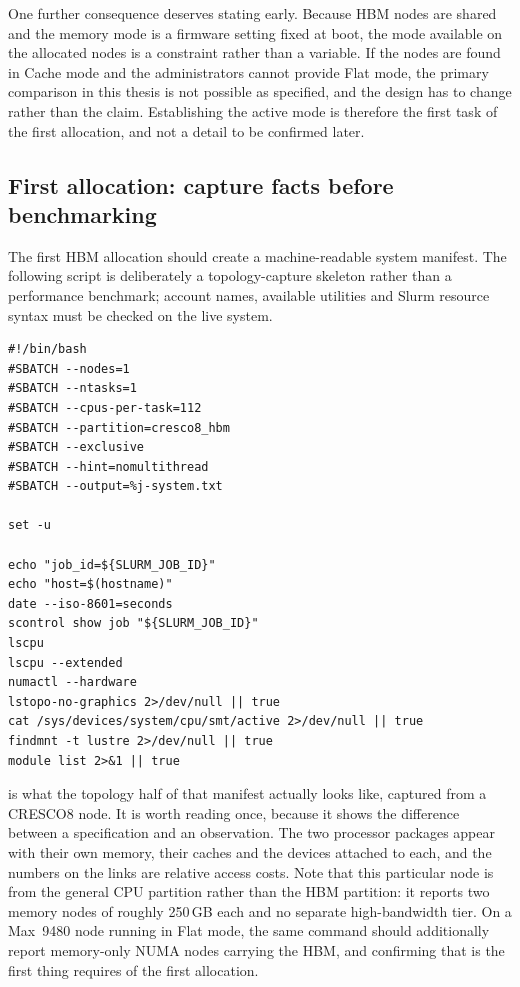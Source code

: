 One further consequence deserves stating early.  Because HBM nodes are
shared and the memory mode is a firmware setting fixed at boot, the mode
available on the allocated nodes is a constraint rather than a variable.
If the nodes are found in Cache mode and the administrators cannot
provide Flat mode, the primary comparison in this thesis is not
possible as specified, and the design has to change rather than the
claim.  Establishing the active mode is therefore the first task of the
first allocation, and not a detail to be confirmed later.

\subsection{First allocation: capture facts before benchmarking}
\label{sec:first-allocation}

The first HBM allocation should create a machine-readable system
manifest.  The following script is deliberately a topology-capture
skeleton rather than a performance benchmark; account names, available
utilities and Slurm resource syntax must be checked on the live system.

\begin{lstlisting}[style=shell,
  caption={Minimal exclusive allocation for a CRESCO8 topology
  manifest.}]
#!/bin/bash
#SBATCH --nodes=1
#SBATCH --ntasks=1
#SBATCH --cpus-per-task=112
#SBATCH --partition=cresco8_hbm
#SBATCH --exclusive
#SBATCH --hint=nomultithread
#SBATCH --output=%j-system.txt

set -u

echo "job_id=${SLURM_JOB_ID}"
echo "host=$(hostname)"
date --iso-8601=seconds
scontrol show job "${SLURM_JOB_ID}"
lscpu
lscpu --extended
numactl --hardware
lstopo-no-graphics 2>/dev/null || true
cat /sys/devices/system/cpu/smt/active 2>/dev/null || true
findmnt -t lustre 2>/dev/null || true
module list 2>&1 || true
\end{lstlisting}

 is what the topology half of that manifest
actually looks like, captured from a CRESCO8 node.  It is worth reading
once, because it shows the difference between a specification and an
observation.  The two processor packages appear with their own memory,
their caches and the devices attached to each, and the numbers on the
links are relative access costs.  Note that this particular node is from
the general CPU partition rather than the HBM partition: it reports two
memory nodes of roughly 250\,GB each and no separate high-bandwidth
tier.  On a Max~9480 node running in Flat mode, the same command should
additionally report memory-only NUMA nodes carrying the HBM, and
confirming that is the first thing  requires of
the first allocation.

